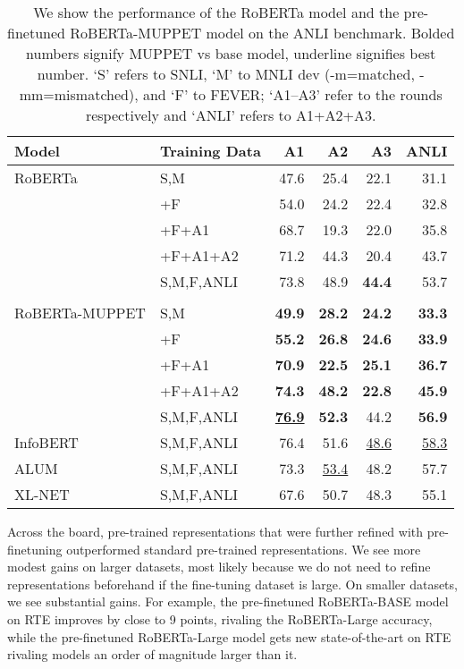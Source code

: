 \documentclass[11pt,a4paper]{article}
\begin{document}
\begin{table*}[t]
    \centering
    \small
    \begin{tabular}{llrrrr}
    \toprule
    \textbf{Model} & \textbf{Training Data} & A1 & A2 & A3 & ANLI \\ \midrule
 RoBERTa & S,M & 47.6 & 25.4 & 22.1 & 31.1 \\
 	& +F & 54.0 & 24.2 & 22.4 & 32.8 \\
 	& +F+A1\textbf{} & 68.7 & 19.3 & 22.0 & 35.8 \\
 	& +F+A1+A2\textbf{} & 71.2 & 44.3 & 20.4 & 43.7 
 	 \\
 	& S,M,F,ANLI & 73.8 & 48.9 & \textbf{44.4} & 53.7 \\ 
 	\\ 
 RoBERTa-MUPPET & S,M & \textbf{49.9} & \textbf{28.2} & \textbf{24.2} & \textbf{33.3} \\
 	& +F & \textbf{55.2} & \textbf{26.8} & \textbf{24.6} & \textbf{33.9} \\
 	& +F+A1\textbf{} & \textbf{70.9} & \textbf{22.5} & \textbf{25.1} & \textbf{36.7} \\
 	& +F+A1+A2\textbf{} & \textbf{74.3} & \textbf{48.2} & \textbf{22.8} & \textbf{45.9} 
 	 \\
 	& S,M,F,ANLI & \textbf{\underline{76.9}} & \textbf{52.3} & 44.2 & \textbf{56.9} \\\midrule
InfoBERT \cite{infobert} 	& S,M,F,ANLI & 76.4 & 51.6 & \underline{48.6} & \underline{58.3} \\
ALUM \cite{ALUM}	& S,M,F,ANLI & 73.3 & \underline{53.4} & 48.2 & 57.7 \\
XL-NET \cite{XLNET} 	& S,M,F,ANLI & 67.6 & 50.7 & 48.3 & 55.1 \\
 	\bottomrule
 	 \end{tabular}
     \vspace{-5pt}
     \caption{We show the performance of the RoBERTa model and the pre-finetuned RoBERTa-MUPPET model on the ANLI benchmark. Bolded numbers signify MUPPET vs base model, underline signifies best number. `S' refers to \textsc{SNLI}, `M' to \textsc{MNLI} dev (-m=matched, -mm=mismatched), and `F' to \textsc{FEVER}; `A1--A3' refer to the rounds respectively and `ANLI' refers to A1+A2+A3.}
     \label{table:anli_perf}
\end{table*}
Across the board, pre-trained representations that were further refined with pre-finetuning outperformed standard pre-trained representations. We see more modest gains on larger datasets, most likely because we do not need to refine representations beforehand if the fine-tuning dataset is large. On smaller datasets, we see substantial gains. For example, the pre-finetuned RoBERTa-BASE model on RTE improves by close to 9 points, rivaling the RoBERTa-Large accuracy, while the pre-finetuned RoBERTa-Large model gets new state-of-the-art on RTE rivaling models an order of magnitude larger than it.
\end{document}
